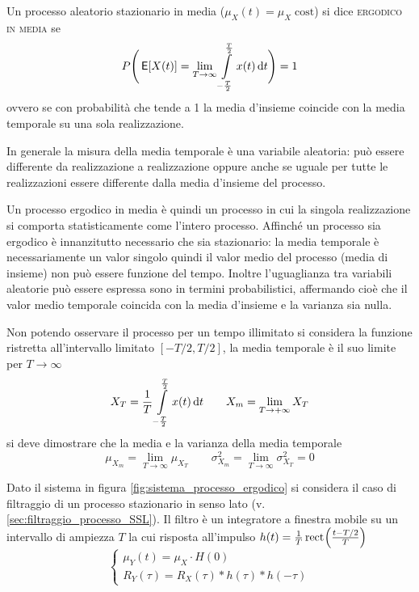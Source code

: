 \begin{definizione}
Un processo aleatorio stazionario in media ($\mu_X(t)=\mu_X \;\text{cost}$) si dice \textsc{ergodico in media} se
\begin{equation}
P\Bigg( \,{\operatorname{\mathsf{E}}}\!\left[{X(t)}\right]=\lim\limits_{T\to\infty}\int\limits_{-\frac{T}{2}}^{\frac{T}{2}}{x(t)}{\,\mathop{}\!\mathrm{d}{t}}\Bigg)=1
\end{equation}
ovvero se con probabilità che tende a 1 la media d'insieme coincide con la media temporale su una sola realizzazione.
\end{definizione}

In generale la misura della media temporale è una variabile aleatoria: può essere differente da realizzazione a realizzazione oppure anche se uguale per tutte le realizzazioni essere differente dalla media d'insieme del processo.

Un processo ergodico in media è quindi un processo in cui la singola realizzazione si comporta statisticamente come l'intero processo.
Affinché un processo sia ergodico è innanzitutto necessario che sia stazionario: la media temporale è necessariamente un valor singolo quindi il valor medio del processo (media di insieme) non può essere funzione del tempo.
Inoltre l'uguaglianza tra variabili aleatorie può essere espressa sono in termini probabilistici, affermando cioè che il valor medio temporale coincida con la media d'insieme e la varianza sia nulla.

Non potendo osservare il processo per un tempo illimitato si considera la funzione ristretta all'intervallo limitato $[-T/2,T/2]$, la media temporale è il suo limite per $T\to\infty$
\[X_T=\frac{1}{T}\int\limits_{-\frac{T}{2}}^{\frac{T}{2}}{x(t)}{\,\mathop{}\!\mathrm{d}{t}}\qquad X_m=\lim\limits_{T\to +\infty}X_T\]
si deve dimostrare che la media e la varianza della media temporale
\[\mu_{X_m}=\lim\limits_{T\to\infty}\mu_{X_T}\qquad\sigma^2_{X_m}=\lim\limits_{T\to\infty}\sigma^2_{X_T}=0\]

Dato il sistema in figura \ref{fig:sistema_processo_ergodico} si considera il caso di filtraggio di un processo stazionario in senso lato (v.\ref{sec:filtraggio_processo_SSL}). Il filtro è un integratore a finestra mobile su un intervallo di ampiezza $T$ la cui risposta all'impulso $h(t)=\frac{1}{T}\,{\operatorname{rect}}^{}\!\left({\frac{t-T/2}{T}}\right)$
\[\begin{cases}
\mu_Y(t)=\mu_X\cdot H(0)\\R_Y(\tau)=R_X(\tau)\ast h(\tau)\ast h(-\tau)
\end{cases}\]

